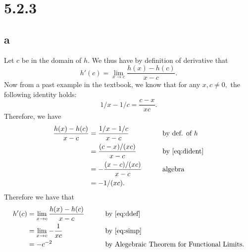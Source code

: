 \documentclass[10pt]{article}
\begin{document}
\section*{5.2.3}

\subsection*{a}


Let $c$ be in the domain of $h$. We thus have by definition of derivative that
\begin{equation} \label{eq:ddef}
    h'(c) = \lim_{x\to c}\frac{h(x)-h(c)}{x-c}. 
\end{equation}
Now from a past example in the textbook, we know that for any $x,c\neq 0,$ the following identity holds:
\begin{equation} \label{eq:dident}
    1/x-1/c = \frac{c-x}{xc}.
\end{equation}
Therefore, we have
\begin{alignat}{2}
    \frac{h(x)-h(c)}{x-c} &= \frac{1/x-1/c}{x-c} &&\text{by def. of }h\nonumber\\
    &= \frac{(c-x)/(xc)}{x-c} &&\text{by \eqref{eq:dident}}\nonumber\\
    &=-\frac{(x-c)/(xc)}{x-c} \qquad&&\text{algebra}\nonumber\\
    &= -1/(xc) \label{eq:simp}.
\end{alignat}
Therefore we have that
\begin{alignat*}{2}
    h'(c) &= \lim_{x\to c}\frac{h(x)-h(c)}{x-c} \qquad&&\text{by \eqref{eq:ddef}}\\
    &= \lim_{x\to c} -\frac{1}{xc} &&\text{by \eqref{eq:simp}}\\
    &= -c^{-2} &&\text{by Alegebraic Theorem for Functional Limits}.
\end{alignat*}
\end{document}
